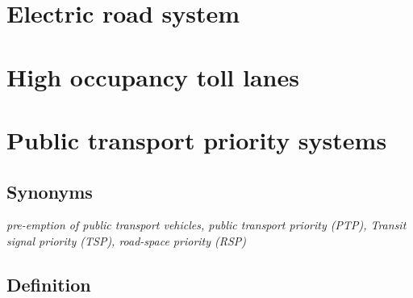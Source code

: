 \documentclass[
]{book}
\begin{document}
\hypertarget{electric-road-system}{%
\section{Electric road system}\label{electric-road-system}}

\hypertarget{high-occupancy-toll-lanes}{%
\section{High occupancy toll lanes}\label{high-occupancy-toll-lanes}}

\hypertarget{public-transport-priority-systems}{%
\section{Public transport priority systems}\label{public-transport-priority-systems}}

\hypertarget{synonyms-1}{%
\subsection*{Synonyms}\label{synonyms-1}}

\emph{pre-emption of public transport vehicles, public transport priority (PTP), Transit signal priority (TSP), road-space priority (RSP)}

\hypertarget{definition-1}{%
\subsection*{Definition}\label{definition-1}}
\end{document}

